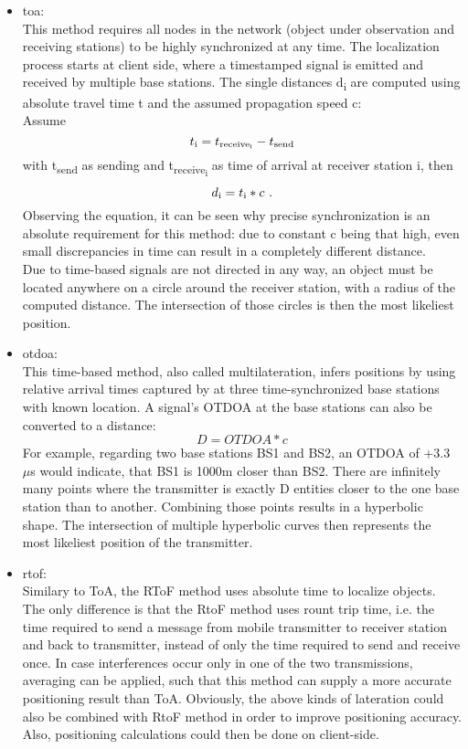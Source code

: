 \begin{itemize}
	\item \ac{toa}:\\
	This method requires all nodes in the network (object under observation and receiving stations) to be highly synchronized at any time. 
	The localization process starts at client side, where a timestamped signal is emitted and received by multiple base stations. The single distances d\textsubscript{i} are computed using absolute travel time t and the assumed propagation speed c: \\		 
	Assume 
	\[ t\textsubscript{i} = t\textsubscript{receive\textsubscript{i}} - t\textsubscript{send} \]
	with t\textsubscript{send} as sending and t\textsubscript{receive\textsubscript{i}} as time of arrival at receiver station i, then
	\[ d\textsubscript{i} =  t\textsubscript{i}  *  c \text{  .}\] 
	Observing the equation, it can be seen why precise synchronization is an absolute requirement for this method: due to constant c being that high, even small discrepancies in time can result in a completely different distance.\\
	Due to time-based signals are not directed in any way, an object must be located anywhere on a circle around the receiver station, with a radius of the computed distance. The intersection of those circles is then the most likeliest position.
	
	\item \ac{otdoa}:\\
	This time-based method, also called multilateration, infers positions by using relative arrival times captured by at three time-synchronized base stations with known location. A signal's OTDOA at the base stations can also be converted to a distance: \[ D = OTDOA * c\]
	For example, regarding two base stations BS1 and BS2, an OTDOA of +3.3 $\mu$s would indicate, that BS1 is 1000m closer than BS2. 
	There are infinitely many points where the transmitter is exactly D entities closer to the one base station than to another. Combining those points results in a hyperbolic shape. The intersection of multiple hyperbolic curves then represents the most likeliest position of the transmitter.	
	
	\item \ac{rtof}:\\
	Similary to ToA, the RToF method uses absolute time to localize objects. The only difference is that the RtoF method uses rount trip time, i.e. the time required to send a message from mobile transmitter to receiver station and back to transmitter, instead of only the time required to send and receive once. 
	In case interferences occur only in one of the two transmissions, averaging can be applied, such that this method can supply a more accurate positioning result than ToA. Obviously, the above kinds of lateration could also be combined with RtoF method in order to improve positioning accuracy. Also, positioning calculations could then be done on client-side.
	

\end{itemize}
